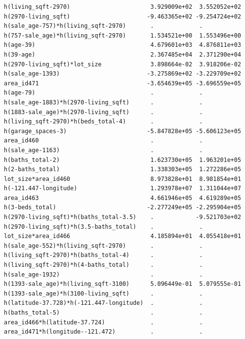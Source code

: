 \documentclass[
]{article}
\begin{document}
\begin{verbatim}
h(living_sqft-2970)                       3.929009e+02  3.552052e+02
h(2970-living_sqft)                      -9.463365e+02 -9.254724e+02
h(sale_age-757)*h(living_sqft-2970)       .             .           
h(757-sale_age)*h(living_sqft-2970)       1.534521e+00  1.553496e+00
h(age-39)                                 4.679601e+03  4.876811e+03
h(39-age)                                 2.367485e+04  2.371290e+04
h(2970-living_sqft)*lot_size              3.898664e-02  3.918206e-02
h(sale_age-1393)                         -3.275869e+02 -3.229709e+02
area_id471                               -3.654639e+05 -3.696559e+05
h(age-79)                                 .             .           
h(sale_age-1883)*h(2970-living_sqft)      .             .           
h(1883-sale_age)*h(2970-living_sqft)      .             .           
h(living_sqft-2970)*h(beds_total-4)       .             .           
h(garage_spaces-3)                       -5.847828e+05 -5.606123e+05
area_id460                                .             .           
h(sale_age-1163)                          .             .           
h(baths_total-2)                          1.623730e+05  1.963201e+05
h(2-baths_total)                          1.338303e+05  1.272286e+05
lot_size*area_id460                       8.973828e+01  8.981854e+01
h(-121.447-longitude)                     1.293978e+07  1.311044e+07
area_id463                                4.661946e+05  4.619289e+05
h(3-beds_total)                          -2.277249e+05 -2.295904e+05
h(2970-living_sqft)*h(baths_total-3.5)    .            -9.521703e+02
h(2970-living_sqft)*h(3.5-baths_total)    .             .           
lot_size*area_id466                       4.185894e+01  4.055418e+01
h(sale_age-552)*h(living_sqft-2970)       .             .           
h(living_sqft-2970)*h(baths_total-4)      .             .           
h(living_sqft-2970)*h(4-baths_total)      .             .           
h(sale_age-1932)                          .             .           
h(1393-sale_age)*h(living_sqft-3100)      5.096449e-01  5.079555e-01
h(1393-sale_age)*h(3100-living_sqft)      .             .           
h(latitude-37.728)*h(-121.447-longitude)  .             .           
h(baths_total-5)                          .             .           
area_id466*h(latitude-37.724)             .             .           
area_id471*h(longitude--121.472)          .             .           
                                                                    

\end{verbatim}
\end{document}
